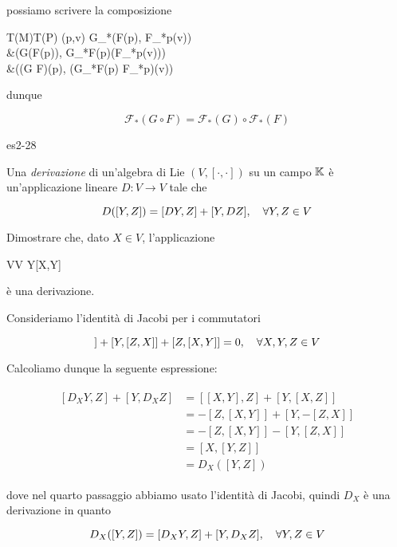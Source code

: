 {possiamo scrivere la composizione

	{T(M)}{T(P)}
	{(p,v)}{ %
				G_{*}(F(p), F_{*p}(v)) \\
				&\mapsto (G(F(p)), G_{*F(p)}(F_{*p}(v))) \\
				&\mapsto ((G \circ F)(p), (G_{*F(p)} \circ F_{*p})(v))
				}

dunque

\begin{equation}
	\mathcal{F}_{*}(G \circ F) = \mathcal{F}_{*}(G) \circ \mathcal{F}_{*}(F)
\end{equation}
}


{es2-28}
{
Una \textit{derivazione} di un'algebra di Lie $ (V,[\cdot,\cdot]) $ su un campo $ \mathbb{K} $ è un'applicazione lineare $ D : V \to V $ tale che

\begin{equation}
	D([Y,Z]) = [DY,Z] + [Y,DZ] \qcomma \forall Y,Z \in V
\end{equation}

Dimostrare che, dato $ X \in V $, l'applicazione

	{V}{V}
	{Y}{[X,Y]}

è una derivazione.
}
{
Consideriamo l'identità di Jacobi per i commutatori

\begin{equation}
	[X,[Y,Z]] + [Y,[Z,X]] + [Z,[X,Y]] = 0 \qcomma \forall X,Y,Z \in V
\end{equation}

Calcoliamo dunque la seguente espressione:

\begin{align}
	\begin{split}
		[D_{X} Y,Z] + [Y,D_{X} Z] &= [[X,Y],Z] + [Y,[X,Z]] \\
		&= - [Z,[X,Y]] + [Y,-[Z,X]] \\
		&= - [Z,[X,Y]] - [Y,[Z,X]] \\
		&= [X,[Y,Z]] \\
		&= D_{X}([Y,Z])
	\end{split}
\end{align}

dove nel quarto passaggio abbiamo usato l'identità di Jacobi, quindi $ D_{X} $ è una derivazione in quanto

\begin{equation}
	D_{X}([Y,Z]) = [D_{X} Y,Z] + [Y,D_{X} Z] \qcomma \forall Y,Z \in V
\end{equation}
}

